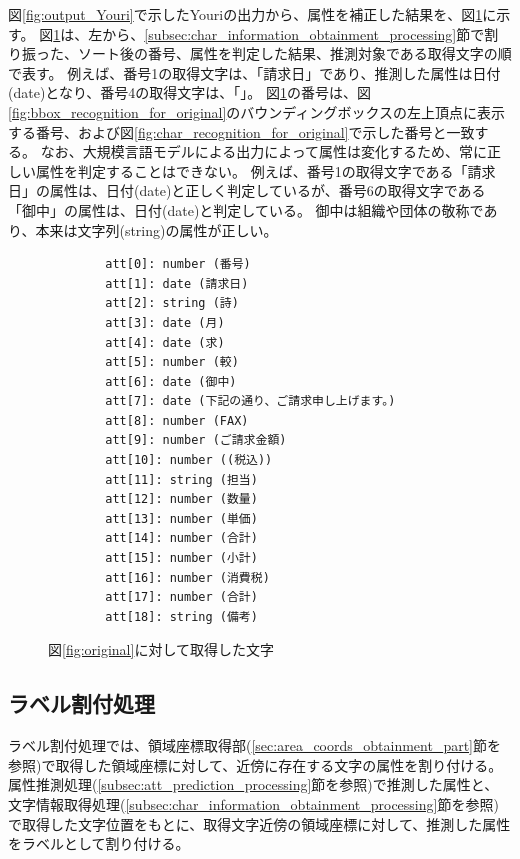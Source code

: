 図\ref{fig:output_Youri}で示したYouriの出力から、属性を補正した結果を、図\ref{fig:predict_att_for_original}に示す。
図\ref{fig:predict_att_for_original}は、左から、\ref{subsec:char_information_obtainment_processing}節で割り振った、ソート後の番号、属性を判定した結果、推測対象である取得文字の順で表す。
例えば、番号1の取得文字は、「請求日」であり、推測した属性は日付(date)となり、番号4の取得文字は、「」。
図\ref{fig:predict_att_for_original}の番号は、図\ref{fig:bbox_recognition_for_original}のバウンディングボックスの左上頂点に表示する番号、および図\ref{fig:char_recognition_for_original}で示した番号と一致する。
なお、大規模言語モデルによる出力によって属性は変化するため、常に正しい属性を判定することはできない。
例えば、番号1の取得文字である「請求日」の属性は、日付(date)と正しく判定しているが、番号6の取得文字である「御中」の属性は、日付(date)と判定している。
御中は組織や団体の敬称であり、本来は文字列(string)の属性が正しい。

\lstset{language=}
\begin{figure}[t]
    \begin{lstlisting}
        att[0]: number (番号)
        att[1]: date (請求日)
        att[2]: string (詩)
        att[3]: date (月)
        att[4]: date (求)
        att[5]: number (較)
        att[6]: date (御中)
        att[7]: date (下記の通り、ご請求申し上げます。)
        att[8]: number (FAX)
        att[9]: number (ご請求金額)
        att[10]: number ((税込))
        att[11]: string (担当)
        att[12]: number (数量)
        att[13]: number (単価)
        att[14]: number (合計)
        att[15]: number (小計)
        att[16]: number (消費税)
        att[17]: number (合計)
        att[18]: string (備考)
    \end{lstlisting}
    \caption{図\ref{fig:original}に対して取得した文字}
    \label{fig:predict_att_for_original}
\end{figure}

\subsection{ラベル割付処理}\label{subsec:label_link_processing}
ラベル割付処理では、領域座標取得部(\ref{sec:area_coords_obtainment_part}節を参照)で取得した領域座標に対して、近傍に存在する文字の属性を割り付ける。
属性推測処理(\ref{subsec:att_prediction_processing}節を参照)で推測した属性と、文字情報取得処理(\ref{subsec:char_information_obtainment_processing}節を参照)で取得した文字位置をもとに、取得文字近傍の領域座標に対して、推測した属性をラベルとして割り付ける。

